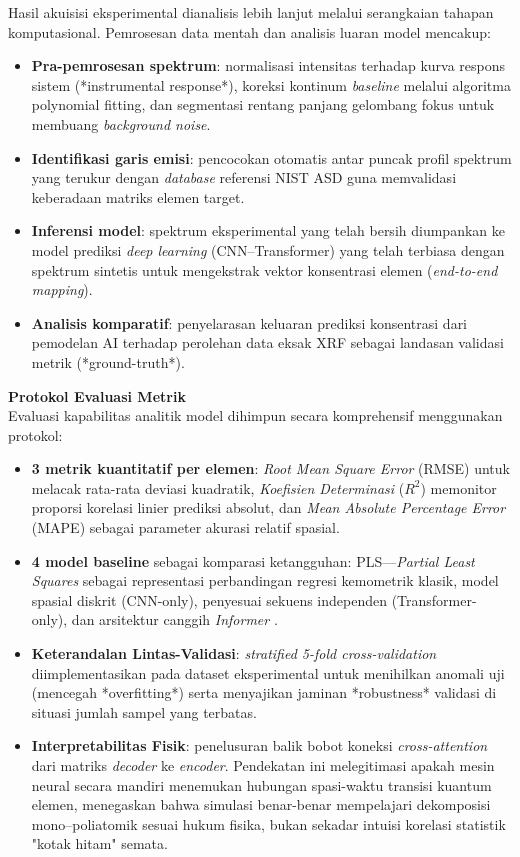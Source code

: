 \documentclass[12pt, a4paper]{article}
\begin{document}
Hasil akuisisi eksperimental dianalisis lebih lanjut melalui serangkaian tahapan komputasional. Pemrosesan data mentah dan analisis luaran model mencakup:
\begin{itemize}[leftmargin=2cm]
    \item \textbf{Pra-pemrosesan spektrum}: normalisasi intensitas terhadap kurva respons sistem (*instrumental response*), koreksi kontinum \textit{baseline} melalui algoritma polynomial fitting, dan segmentasi rentang panjang gelombang fokus untuk membuang \textit{background noise}.
    \item \textbf{Identifikasi garis emisi}: pencocokan otomatis antar puncak profil spektrum yang terukur dengan \textit{database} referensi NIST ASD guna memvalidasi keberadaan matriks elemen target.
    \item \textbf{Inferensi model}: spektrum eksperimental yang telah bersih diumpankan ke model prediksi \textit{deep learning} (CNN--Transformer) yang telah terbiasa dengan spektrum sintetis untuk mengekstrak vektor konsentrasi elemen (\textit{end-to-end mapping}).
    \item \textbf{Analisis komparatif}: penyelarasan keluaran prediksi konsentrasi dari pemodelan AI terhadap perolehan data eksak XRF sebagai landasan validasi metrik (*ground-truth*).
\end{itemize}

\textbf{Protokol Evaluasi Metrik} \\
Evaluasi kapabilitas analitik model dihimpun secara komprehensif menggunakan protokol:
\begin{itemize}[leftmargin=2cm]
    \item \textbf{3 metrik kuantitatif per elemen}: \textit{Root Mean Square Error} (RMSE) untuk melacak rata-rata deviasi kuadratik, \textit{Koefisien Determinasi} ($R^2$) memonitor proporsi korelasi linier prediksi absolut, dan \textit{Mean Absolute Percentage Error} (MAPE) sebagai parameter akurasi relatif spasial.
    \item \textbf{4 model baseline} sebagai komparasi ketangguhan: PLS—\textit{Partial Least Squares} \citep{wold2001} sebagai representasi perbandingan regresi kemometrik klasik, model spasial diskrit (CNN-only), penyesuai sekuens independen (Transformer-only), dan arsitektur canggih \textit{Informer} \citep{zhou2021, walidain2026}.
    \item \textbf{Keterandalan Lintas-Validasi}: \textit{stratified 5-fold cross-validation} diimplementasikan pada dataset eksperimental untuk menihilkan anomali uji (mencegah *overfitting*) serta menyajikan jaminan *robustness* validasi di situasi jumlah sampel yang terbatas.
    \item \textbf{Interpretabilitas Fisik}: penelusuran balik bobot koneksi \textit{cross-attention} dari matriks \textit{decoder} ke \textit{encoder}. Pendekatan ini melegitimasi apakah mesin neural secara mandiri menemukan hubungan spasi-waktu transisi kuantum elemen, menegaskan bahwa simulasi benar-benar mempelajari dekomposisi mono--poliatomik sesuai hukum fisika, bukan sekadar intuisi korelasi statistik "kotak hitam" semata.
\end{itemize}
\end{document}
